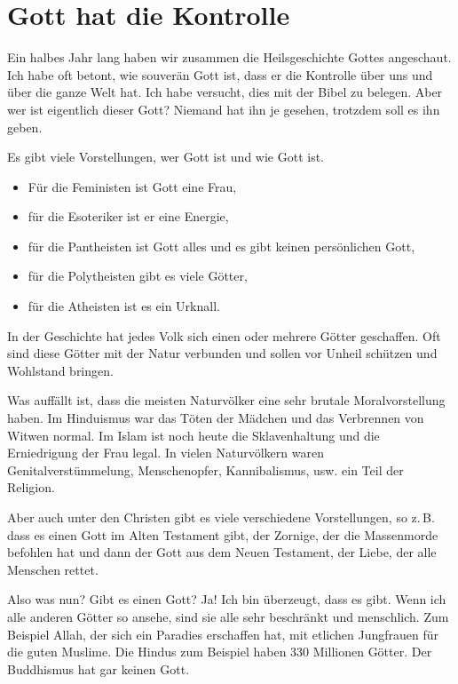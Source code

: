\section{Gott hat die Kontrolle}
\begin{otsblock}
        Ein halbes Jahr lang haben wir zusammen die Heilsgeschichte Gottes angeschaut. Ich habe oft betont, wie souverän Gott ist, dass er die Kontrolle über uns und über die ganze Welt hat. Ich habe versucht, dies mit der Bibel zu belegen. Aber wer ist eigentlich dieser Gott? Niemand hat ihn je gesehen, trotzdem soll es ihn geben.

        Es gibt viele Vorstellungen, wer Gott ist und wie Gott ist. 
        \begin{itemize}
            \item Für die Feministen ist Gott eine Frau, 
            \item für die Esoteriker ist er eine Energie,
            \item für die Pantheisten ist Gott alles und es gibt keinen persönlichen Gott,
            \item für die Polytheisten gibt es viele Götter,
            \item für die Atheisten ist es ein Urknall.
        \end{itemize}       

        In der Geschichte hat jedes Volk sich einen oder mehrere Götter geschaffen. Oft sind diese Götter mit der Natur verbunden und sollen vor Unheil schützen und Wohlstand bringen.

        Was auffällt ist, dass die meisten Naturvölker eine sehr brutale Moralvorstellung haben. Im Hinduismus war das Töten der Mädchen und das Verbrennen von Witwen normal. Im Islam ist noch heute die Sklavenhaltung und die Erniedrigung der Frau legal. In vielen Naturvölkern waren Genitalverstümmelung, Menschenopfer, Kannibalismus, usw. ein Teil der Religion.

        Aber auch unter den Christen gibt es viele verschiedene Vorstellungen, so z.\,B. dass es einen Gott im Alten Testament gibt, der Zornige, der die Massenmorde befohlen hat und dann der Gott aus dem Neuen Testament, der Liebe, der alle Menschen rettet.

        Also was nun? Gibt es  einen Gott? Ja! Ich bin überzeugt, dass es  gibt. Wenn ich alle anderen Götter so ansehe, sind sie alle sehr beschränkt und menschlich. Zum Beispiel Allah, der sich ein Paradies erschaffen hat, mit etlichen Jungfrauen für die guten Muslime. Die Hindus zum Beispiel haben 330 Millionen Götter. Der Buddhismus hat gar keinen Gott.


\end{otsblock}
